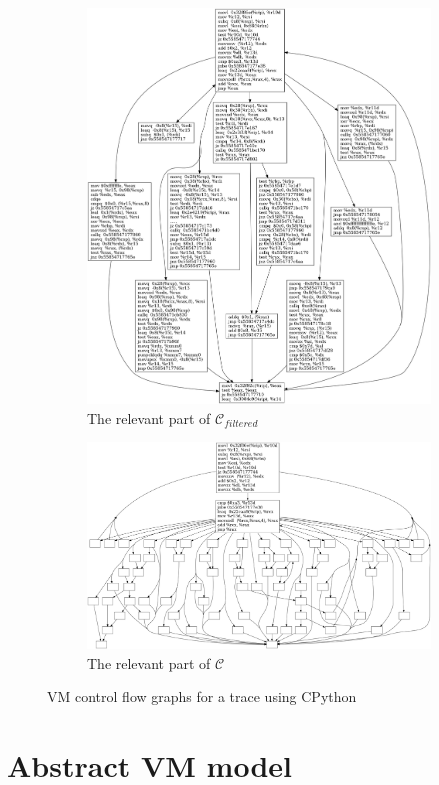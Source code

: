 \documentclass[french]{article}
\begin{document}
\begin{figure}[htp]
	\centering
	\begin{subfigure}{.5\textwidth}
		\centering 	
		\includegraphics[width=.7\linewidth]{img/ConcreteVMFiltered.png}
		\caption{The relevant part of $\mathcal{C}_{filtered}$}
		\label{fig:concreteVM:Filtered}
	\end{subfigure}%
	\begin{subfigure}{.5\textwidth}
		\centering 	
		\includegraphics[width=.7\linewidth]{img/ConcreteVMOriginal.png}
		\caption{The relevant part of $\mathcal{C}$}
		\label{fig:concreteVM:Original}
	\end{subfigure}
	\caption{VM control flow graphs for a trace using CPython}
	\label{fig:concreteVM}
\end{figure}


\section{Abstract VM model}
\end{document}
